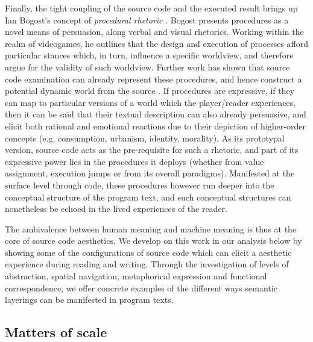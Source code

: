 Finally, the tight coupling of the source code and the executed result brings up Ian Bogost's concept of \emph{procedural rhetoric} \citep{bogost_rhetoric_2008}. Bogost presents procedures as a novel means of persuasion, along verbal and visual rhetorics. Working within the realm of videogames, he outlines that the design and execution of processes afford particular stances which, in turn, influence a specific worldview, and therefore argue for the validity of such worldview. Further work has shown that source code examination can already represent these procedures, and hence construct a potential dynamic world from the source \citep{tirrell_dumb_2012,brock_rhetorical_2019}. If procedures are expressive, if they can map to particular versions of a world which the player/reader experiences, then it can be said that their textual description can also already persuasive, and elicit both rational and emotional reactions due to their depiction of higher-order concepts (e.g. consumption, urbanism, identity, morality). As its prototypal version, source code acts as the pre-requisite for such a rhetoric, and part of its expressive power lies in the procedures it deploys (whether from value assignment, execution jumps or from its overall paradigms). Manifested at the surface level through code, these procedures however run deeper into the conceptual structure of the program text, and such conceptual structures can nonetheless be echoed in the lived experiences of the reader.

The ambivalence between human meaning and machine meaning is thus at the core of source code aesthetics. We develop on this work in our analysis below by showing some of the configurations of source code which can elicit a aesthetic experience during reading and writing. Through the investigation of levels of abstraction, spatial navigation, metaphorical expression and functional correspondence, we offer concrete examples of the different ways semantic layerings can be manifested in program texts.

\subsection{Matters of scale}
\label{subsec:matters-of-scale}

